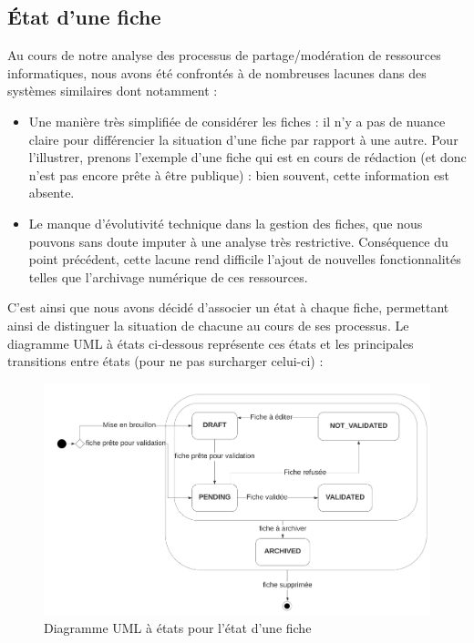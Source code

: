 \subsection*{État d'une fiche}

Au cours de notre analyse des processus de partage/modération de ressources informatiques, nous avons été confrontés à de nombreuses lacunes dans des systèmes similaires dont notamment :
\begin{itemize}
    \item Une manière très simplifiée de considérer les fiches : il n'y a pas de nuance claire pour différencier la situation d'une fiche par rapport à une autre. Pour l'illustrer, prenons l'exemple d'une fiche qui est en cours de rédaction (et donc n'est pas encore prête à être publique) : bien souvent, cette information est absente.
    \item Le manque d'évolutivité technique dans la gestion des fiches, que nous pouvons sans doute imputer à une analyse très restrictive. Conséquence du point précédent, cette lacune rend difficile l'ajout de nouvelles fonctionnalités telles que l'archivage numérique de ces ressources. 
\end{itemize}

C'est ainsi que nous avons décidé d'associer un état à chaque fiche, permettant ainsi de distinguer la situation de chacune au cours de ses processus. Le diagramme UML à états ci-dessous représente ces états et les principales transitions entre états (pour ne pas surcharger celui-ci) :

\begin{figure}[H]
    \includegraphics[width=\textwidth,height=\textheight,keepaspectratio]{images/StateFiches.png}
    \centering
    \caption{Diagramme UML à états pour l'état d'une fiche}
    \label{pic:stateDiagramForFiches}
\end{figure}

